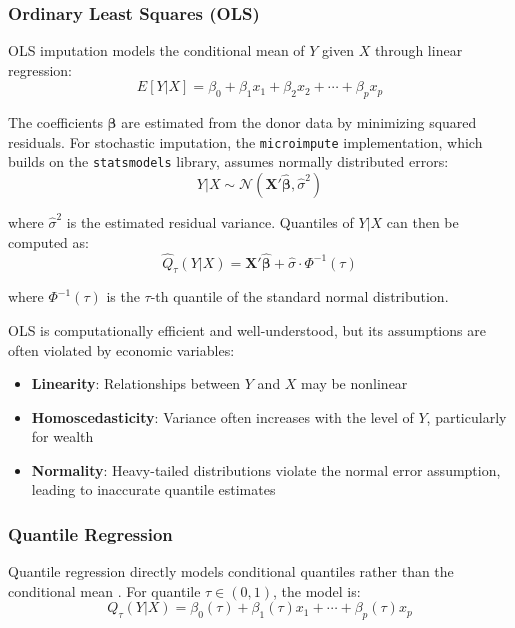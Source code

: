 \subsubsection{Ordinary Least Squares (OLS)}

OLS imputation models the conditional mean of $Y$ given $X$ through linear regression:
\begin{equation}
    E[Y|X] = \beta_0 + \beta_1 x_1 + \beta_2 x_2 + \cdots + \beta_p x_p
\end{equation}

The coefficients $\boldsymbol{\beta}$ are estimated from the donor data by minimizing squared residuals. For stochastic imputation, the \texttt{microimpute} implementation, which builds on the \texttt{statsmodels} library, assumes normally distributed errors:
\begin{equation}
    Y|X \sim \mathcal{N}(\boldsymbol{X}'\boldsymbol{\hat{\beta}}, \hat{\sigma}^2)
\end{equation}

where $\hat{\sigma}^2$ is the estimated residual variance. Quantiles of $Y|X$ can then be computed as:
\begin{equation}
    \hat{Q}_\tau(Y|X) = \boldsymbol{X}'\boldsymbol{\hat{\beta}} + \hat{\sigma} \cdot \Phi^{-1}(\tau)
\end{equation}

where $\Phi^{-1}(\tau)$ is the $\tau$-th quantile of the standard normal distribution.

OLS is computationally efficient and well-understood, but its assumptions are often violated by economic variables:
\begin{itemize}
    \item \textbf{Linearity}: Relationships between $Y$ and $X$ may be nonlinear
    \item \textbf{Homoscedasticity}: Variance often increases with the level of $Y$, particularly for wealth
    \item \textbf{Normality}: Heavy-tailed distributions violate the normal error assumption, leading to inaccurate quantile estimates \citep{vonhippel2007should}
\end{itemize}

\subsubsection{Quantile Regression}

Quantile regression directly models conditional quantiles rather than the conditional mean \citep{koenker1978regression}. For quantile $\tau \in (0,1)$, the model is:
\begin{equation}
    Q_\tau(Y|X) = \beta_0(\tau) + \beta_1(\tau) x_1 + \cdots + \beta_p(\tau) x_p
\end{equation}


